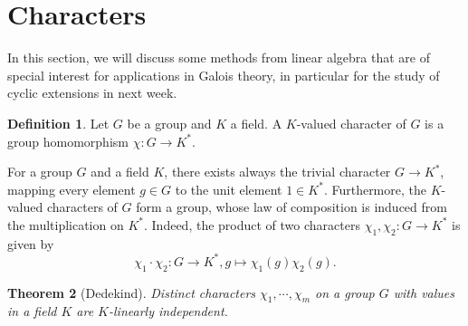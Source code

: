 \documentclass[12pt]{report}
\newtheorem{theorem}{Theorem}[section]
\theoremstyle{definition}
\newtheorem{definition}[theorem]{Definition}
\newcommand{\charr}{\text{char}}
\newcommand{\Gal}{\text{Gal}}
\newcommand{\ZZ}{\mathbb{Z}}
\begin{document}



\section{Characters}

In this section, we will discuss some methods from linear algebra that are of special interest for applications in Galois theory, in particular for the  study of cyclic extensions in next week.

\begin{definition}
	Let $G$ be a group and $K$ a field. A $K$-valued character of $G$ is a group homomorphism $\chi: G \to K^*$.
\end{definition}

For a group $G$ and a field $K$, there exists always the trivial character $G \to K^*$, mapping every element $g \in G$ to the unit element $1 \in K^*$. Furthermore, the $K$-valued characters of $G$ form a group, whose law of composition is induced from the multiplication on $K^*$. Indeed, the product of two characters $\chi_1, \chi_2 : G \to K^*$ is given by $$\chi_1 \cdot \chi_2: G\to K^*, g\mapsto \chi_1(g)\chi_2(g).$$

\begin{theorem}[Dedekind]
	Distinct characters $\chi_1, \cdots, \chi_m$ on a group $G$ with values in a field $K$ are $K$-linearly independent.
\end{theorem}
\end{document}
